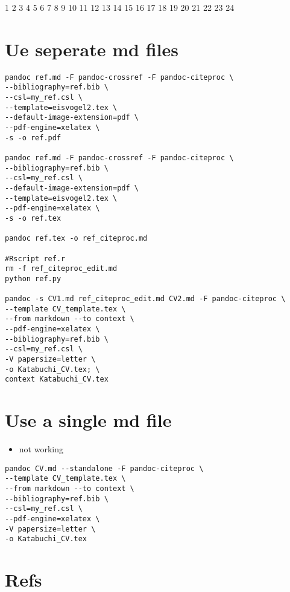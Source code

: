 \documentclass[
]{article}
\author{}
\date{}
\providecommand{\tightlist}{%
  \setlength{\itemsep}{0pt}\setlength{\parskip}{0pt}}
\begin{document}
1 2 3 4 5 6 7 8 9 10 11 12 13 14 15 16 17 18 19 20 21 22 23 24

\hypertarget{ue-seperate-md-files}{%
\section{Ue seperate md files}\label{ue-seperate-md-files}}

\begin{verbatim}
pandoc ref.md -F pandoc-crossref -F pandoc-citeproc \
--bibliography=ref.bib \
--csl=my_ref.csl \
--template=eisvogel2.tex \
--default-image-extension=pdf \
--pdf-engine=xelatex \
-s -o ref.pdf

pandoc ref.md -F pandoc-crossref -F pandoc-citeproc \
--bibliography=ref.bib \
--csl=my_ref.csl \
--default-image-extension=pdf \
--template=eisvogel2.tex \
--pdf-engine=xelatex \
-s -o ref.tex

pandoc ref.tex -o ref_citeproc.md

#Rscript ref.r 
rm -f ref_citeproc_edit.md
python ref.py 

pandoc -s CV1.md ref_citeproc_edit.md CV2.md -F pandoc-citeproc \
--template CV_template.tex \
--from markdown --to context \
--pdf-engine=xelatex \
--bibliography=ref.bib \
--csl=my_ref.csl \
-V papersize=letter \
-o Katabuchi_CV.tex; \
context Katabuchi_CV.tex
\end{verbatim}

\hypertarget{use-a-single-md-file}{%
\section{Use a single md file}\label{use-a-single-md-file}}

\begin{itemize}
\tightlist
\item
  not working
\end{itemize}

\begin{verbatim}
pandoc CV.md --standalone -F pandoc-citeproc \
--template CV_template.tex \
--from markdown --to context \
--bibliography=ref.bib \
--csl=my_ref.csl \
--pdf-engine=xelatex \
-V papersize=letter \
-o Katabuchi_CV.tex
\end{verbatim}

\hypertarget{refs}{%
\section*{Refs}\label{refs}}
\end{document}
